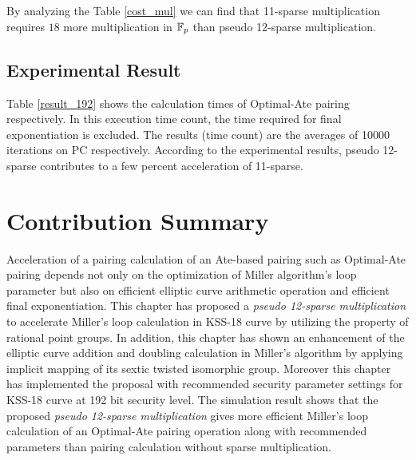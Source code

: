 By analyzing the Table \ref{cost_mul} we can find that  11-sparse multiplication requires $18$ more multiplication in ${\mathbb{F}}_{p}$ than pseudo 12-sparse multiplication.
\subsection{Experimental Result}
Table \ref{result_192} shows the calculation times of Optimal-Ate pairing respectively. In this execution time count, the time required for final exponentiation is excluded. The results (time count) are the averages of 10000 iterations on PC respectively. According to the experimental results, pseudo 12-sparse contributes to a few percent acceleration of 11-sparse.
\renewcommand{\baselinestretch}{1.5}
\begin{table}[ht]
	\begin{center}
		\caption{Calculation time of Optimal-Ate pairing at the 192-bit security level.}
		\label{result_192}
	\end{center}
\end{table}
\renewcommand{\baselinestretch}{1.0}

\section{Contribution Summary}
Acceleration of a pairing calculation of an Ate-based pairing such as Optimal-Ate pairing depends not only on the optimization of Miller algorithm's loop parameter but also on efficient elliptic curve arithmetic operation and efficient final exponentiation. 
This chapter has proposed a \textit{pseudo 12-sparse multiplication} to accelerate Miller's loop calculation in KSS-18 curve by utilizing the property of  rational point groups.
In addition, this chapter has shown an enhancement of the elliptic curve addition and doubling calculation in Miller's algorithm by applying implicit mapping of its sextic twisted isomorphic group. 
Moreover this chapter has implemented the proposal with recommended security parameter settings for KSS-18 curve at 192 bit security level.
The simulation result shows that the proposed \textit{pseudo 12-sparse multiplication} gives more efficient Miller's loop calculation of an Optimal-Ate pairing operation along with recommended parameters than pairing calculation without sparse multiplication.

